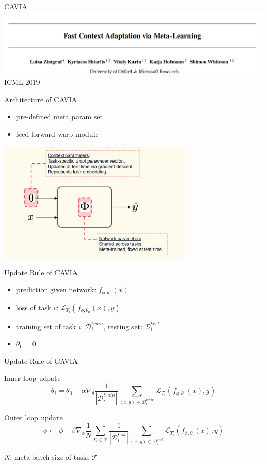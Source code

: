 \documentclass{beamer}
\begin{document}
\begin{frame}{CAVIA}
  \includegraphics[width=\textwidth]{fig/CAVIA.png}
  \center ICML 2019
\end{frame}

\begin{frame}{Architecture of CAVIA}
  \begin{itemize}
    \item pre-defined meta param set
    \item feed-forward warp module
  \end{itemize}
  \center \includegraphics[width=0.7\textwidth]{fig/CAVIA-idea.png}
\end{frame}

\begin{frame}{Update Rule of CAVIA}
  \begin{itemize}
    \item prediction given network: $f_{\phi,\theta_0}(x)$
    \item loss of task $i$: $\mathcal{L}_{T_i}(f_{\phi,\theta_0}(x),y)$
    \item training set of task $i$: $\mathcal{D}_i^{train}$, testing set: $\mathcal{D}_i^{test}$
    \item $\theta_0 = \mathbf{0}$
  \end{itemize}
\end{frame}
\begin{frame}{Update Rule of CAVIA}
  \begin{block}{Inner loop udpate}
    \[\theta_i = \theta_0 - \alpha \nabla_{\theta} \frac{1}{|\mathcal{D}_i^{train}|}\sum_{(x,y) \in \mathcal{D}_i^{train}}\mathcal{L}_{T_i}(f_{\phi,\theta_0}(x),y)\]
  \end{block}

  \begin{block}{Outer loop update}
    \[ \phi \leftarrow \phi - \beta \nabla_{\phi}\frac{1}{N} \sum_{T_i \in \mathcal{T}} \frac{1}{|\mathcal{D}_i^{test}|} \sum_{(x,y) \in \mathcal{D}_i^{test}} \mathcal{L}_{T_i}(f_{\phi,\theta_i}(x),y)\]
  \end{block}
  $N$: meta batch size of tasks $\mathcal{T}$
\end{frame}
\end{document}
